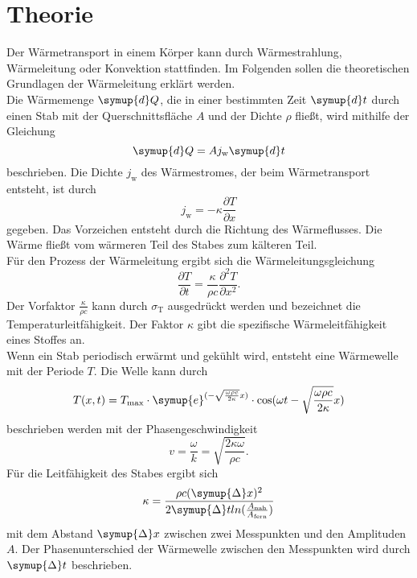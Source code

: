 \section{Theorie} \label{sec:theorie}

    Der Wärmetransport in einem Körper kann durch Wärmestrahlung, Wärmeleitung oder Konvektion
    stattfinden.
    Im Folgenden sollen die theoretischen Grundlagen der Wärmeleitung erklärt werden. \\
    Die Wärmemenge $\symup{d}Q$, die in einer bestimmten Zeit $\symup{d}t$ durch einen Stab mit der
    Querschnittsfläche $A$ und der Dichte $\rho$ fließt, wird mithilfe der Gleichung
    \begin{equation}
        \symup{d}Q =  A j_\text{w} \symup{d}t
    \end{equation}
    beschrieben. 
    Die Dichte $j_\text{w}$ des Wärmestromes, der beim Wärmetransport entsteht, ist durch 
    \begin{equation}
        j_\text{w} = - \kappa \frac{\partial T}{\partial x}
    \end{equation}
    gegeben.
    Das Vorzeichen entsteht durch die Richtung des Wärmeflusses. Die Wärme fließt
    vom wärmeren Teil des Stabes zum kälteren Teil.\\
    Für den Prozess der Wärmeleitung ergibt sich die Wärmeleitungsgleichung
    \begin{equation}
        \frac{\partial T}{\partial t} = \frac{\kappa}{\rho c} \frac{\partial^2 T}{\partial x^2} .
    \end{equation}
    Der Vorfaktor $\frac{\kappa}{\rho c}$ kann durch $\sigma_\text{T}$ ausgedrückt werden
    und bezeichnet die Temperaturleitfähigkeit. 
    Der Faktor $\kappa$ gibt die spezifische Wärmeleitfähigkeit eines Stoffes an. \\
    Wenn ein Stab periodisch erwärmt und gekühlt wird, entsteht eine Wärmewelle mit der Periode $T$.
    Die Welle kann durch 
    \begin{equation}
        T(x,t) = T_\text{max} \cdot \symup{e}^{(- \sqrt{\frac{\omega \rho c}{2\kappa}}x)} \cdot \cos(\omega t - \sqrt{\frac{\omega \rho c}{2 \kappa}}x)
    \end{equation}
    beschrieben werden mit der Phasengeschwindigkeit
    \begin{equation}
        v = \frac{\omega}{k} = \sqrt{\frac{2 \kappa \omega}{\rho c}} .
    \end{equation}
    Für die Leitfähigkeit des Stabes ergibt sich
    \begin{equation}
        \kappa = \frac{\rho c (\symup{\Delta}x)^2}{2 \symup{\Delta}t ln(\frac{A_\text{nah}}{A_\text{fern}})} 
    \end{equation}
    mit dem Abstand $\symup{\Delta}x$ zwischen zwei Messpunkten und den Amplituden $A$. 
    Der Phasenunterschied der Wärmewelle zwischen den Messpunkten wird durch $\symup{\Delta} t$ beschrieben.
